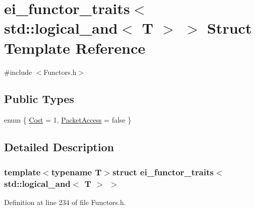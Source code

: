\hypertarget{structei__functor__traits_3_01std_1_1logical__and_3_01_t_01_4_01_4}{\section{ei\-\_\-functor\-\_\-traits$<$ std\-:\-:logical\-\_\-and$<$ T $>$ $>$ Struct Template Reference}
\label{structei__functor__traits_3_01std_1_1logical__and_3_01_t_01_4_01_4}
}


{\ttfamily \#include $<$Functors.\-h$>$}

\subsection*{Public Types}
\begin{DoxyCompactItemize}
\item 
enum \{ \hyperlink{structei__functor__traits_3_01std_1_1logical__and_3_01_t_01_4_01_4_a3c3a1f0dba54b1178fe925265f07e5a0ab6d8861f186422e859987cb497c1a929}{Cost} = 1, 
\hyperlink{structei__functor__traits_3_01std_1_1logical__and_3_01_t_01_4_01_4_a3c3a1f0dba54b1178fe925265f07e5a0ab3e8e506bdf1209e31af1ed2991872db}{Packet\-Access} = false
 \}
\end{DoxyCompactItemize}


\subsection{Detailed Description}
\subsubsection*{template$<$typename T$>$struct ei\-\_\-functor\-\_\-traits$<$ std\-::logical\-\_\-and$<$ T $>$ $>$}



Definition at line 234 of file Functors.\-h.



